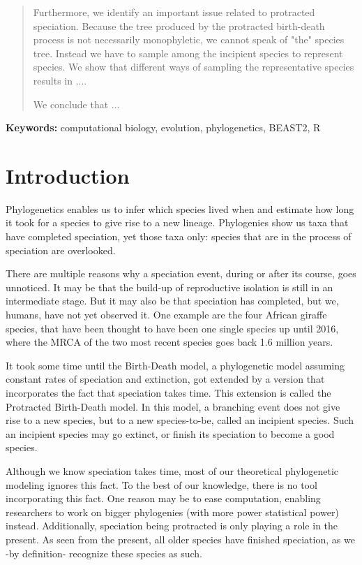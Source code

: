 \documentclass{article}
\begin{document}
\begin{abstract}
  Furthermore, we identify an important issue related to protracted speciation. 
  Because the tree produced by the protracted birth-death process 
  is not necessarily monophyletic, we cannot speak of "the" species tree. 
  Instead we have to sample among the incipient species to represent species. 
  We show that different ways of sampling the representative species results in ....

  We conclude that ...

\end{abstract}

{\bf Keywords:} computational biology, evolution, phylogenetics, BEAST2, R

\section{Introduction}

Phylogenetics enables us to infer which species lived when and
estimate how long it took for a species to give rise to a new
lineage. Phylogenies show us taxa that have completed speciation, yet
those taxa only: species that are in the process of speciation are 
overlooked.

There are multiple reasons why a speciation event, during
or after its course, goes unnoticed. It may be that the build-up
of reproductive isolation is still in an intermediate stage. But it
may also be that speciation has completed, but we, humans, have not
yet observed it. One example are the four African giraffe species, 
that have been thought to have been one single species up until 2016,
where the MRCA of the two most recent species goes back 1.6 million years.

It took some time until the Birth-Death model, a phylogenetic model
assuming constant rates of speciation and extinction, got extended
by a version that incorporates the fact that speciation takes time.
This extension is called the Protracted Birth-Death model. In this
model, a branching event does not give rise to a new species, but to
a new species-to-be, called an incipient species. Such an incipient
species may go extinct, or finish its speciation to become a good species.

Although we know speciation takes time, most of our theoretical 
phylogenetic modeling ignores this fact. To the best of our knowledge,
there is no tool incorporating this fact. One reason may be to ease
computation, enabling researchers to work on bigger phylogenies (with
more power statistical power) instead. Additionally, speciation being
protracted is only playing a role in the present. As seen from the present,
all older species have finished speciation, as we -by definition- recognize
these species as such. 
\end{document}
